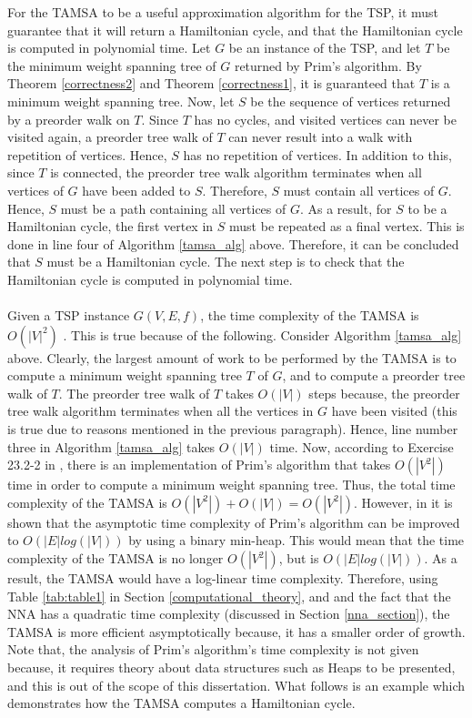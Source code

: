 \documentclass[12pt]{article}
\numberwithin{equation}{subsection}
\numberwithin{table}{subsection}
\numberwithin{algorithm}{subsection}
\numberwithin{figure}{subsection}
\begin{document}
For the TAMSA to be a useful approximation algorithm for the TSP, it must guarantee that it will return a Hamiltonian cycle, and that the Hamiltonian cycle is computed in polynomial time. Let $G$ be an instance of the TSP, and let $T$ be the minimum weight spanning tree of $G$ returned by Prim's algorithm. By Theorem \ref{correctness2} and Theorem \ref{correctness1}, it is guaranteed that $T$ is a minimum weight spanning tree. Now, let $S$ be the sequence of vertices returned by a preorder walk on $T$. Since $T$ has no cycles, and visited vertices can never be visited again, a preorder tree walk of $T$ can never result into a walk with repetition of vertices. Hence, $S$ has no repetition of vertices. In addition to this, since $T$ is connected, the preorder tree walk algorithm terminates when all vertices of $G$ have been added to $S$. Therefore, $S$ must contain all vertices of $G$. Hence, $S$ must be a path containing all vertices of $G$. As a result, for $S$ to be a Hamiltonian cycle, the first vertex in $S$ must be repeated as a final vertex. This is done in line four of Algorithm \ref{tamsa_alg} above. Therefore, it can be concluded that $S$ must be a Hamiltonian cycle. The next step is to check that the Hamiltonian cycle is computed in polynomial time.\\\\
Given a TSP instance $G(V,E,f)$, the time complexity of the TAMSA is $O(|V|^2)$ \cite{cormen_leiserson_rivest_stein}. This is true because of the following. Consider Algorithm \ref{tamsa_alg} above. Clearly, the largest amount of work to be performed by the TAMSA is to compute a minimum weight spanning tree $T$ of $G$, and to compute a preorder tree walk of $T$. The preorder tree walk of $T$ takes $O(|V|)$ steps because, the preorder tree walk algorithm terminates when all the vertices in $G$ have been visited (this is true due to reasons mentioned in the previous paragraph). Hence, line number three in Algorithm \ref{tamsa_alg} takes $O(|V|)$ time. Now, according to Exercise 23.2-2 in \cite{cormen_leiserson_rivest_stein}, there is an implementation of Prim's algorithm that takes $O(|V^2|)$ time in order to compute a minimum weight spanning tree. Thus, the total time complexity of the TAMSA is $O(|V^2|)+ O(|V|) = O(|V^2|)$. However, in \cite{cormen_leiserson_rivest_stein} it is shown that the asymptotic time complexity of Prim's algorithm can be improved to $O(|E| log(|V|))$ by using a binary min-heap. This would mean that the time complexity of the TAMSA is no longer $O(|V^2|)$, but is $O(|E| log(|V|))$. As a result, the TAMSA would have a log-linear time complexity. Therefore, using Table \ref{tab:table1} in Section \ref{computational_theory}, and and the fact that the NNA has a quadratic time complexity (discussed in Section \ref{nna_section}), the TAMSA is more efficient asymptotically because, it has a smaller order of growth. Note that, the analysis of Prim's algorithm's time complexity is not given because, it requires theory about data structures such as Heaps to be presented, and this is out of the scope of this dissertation. What follows is an example which demonstrates how the TAMSA computes a Hamiltonian cycle.
\end{document}
